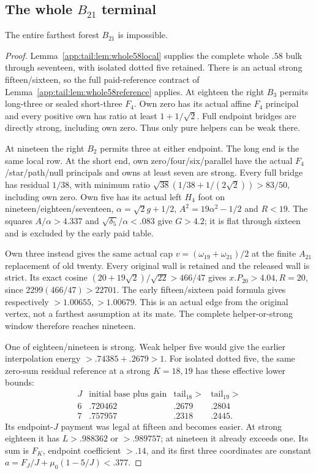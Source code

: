 \subsection{The whole $B_{21}$ terminal}
\label{app:tail:wholeB21}
\begin{proposition}
\label{app:tail:prop:wholeB21}
The entire farthest forest $B_{21}$ is impossible.
\end{proposition}
\begin{proof}
Lemma~\ref{app:tail:lem:whole58local} supplies the complete whole
$.58$ bulk through seventeen, with isolated dotted five retained.
There is an actual strong fifteen/sixteen, so the full paid-reference
contract of Lemma~\ref{app:tail:lem:whole58reference} applies.
At eighteen the right $B_3$ permits long-three or sealed short-three
$F_4$. Own zero has its actual affine $F_4$ principal and every
positive own has ratio at least $1+1/\sqrt2$. Full endpoint bridges
are directly strong, including own zero. Thus only pure helpers
can be weak there.

At nineteen the right $B_2$ permits three at either endpoint.
The long end is the same local row. At the short end, own
zero/four/six/parallel have the actual $F_4$/star/path/null
principals and owns at least seven are strong. Every full bridge
has residual $1/38$, with minimum ratio
$\sqrt{38}(1/38+1/(2\sqrt2))>83/50$, including own zero.
Own five has its actual left $H_4$ foot on nineteen/eighteen/seventeen,
$\alpha=\sqrt2g+1/2$, $A^2=19\alpha^2-1/2$ and $R<19$.
The squares $A/\alpha>4.337$ and
$\sqrt{\delta_5}/\alpha<.083$ give $G>4.2$; it is flat
through sixteen and is excluded by the early paid table.

Own three instead gives the same actual cap
$v=(\omega_{19}+\omega_{21})/2$ at the finite $A_{21}$
replacement of old twenty. Every original wall is retained and
the released wall is strict. Its exact cosine
$(20+19\sqrt2)/\sqrt{22}>466/47$ gives
$x.P_{20}>4.04,R=20$, since $2299(466/47)>22701$.
The early fifteen/sixteen paid formula gives respectively
$>1.00655,>1.00679$. This is an actual edge from the original
vertex, not a farthest assumption at its mate. The complete
helper-or-strong window therefore reaches nineteen.

One of eighteen/nineteen is strong. Weak helper five would give
the earlier interpolation energy $>.74385+.2679>1$.
For isolated dotted five, the same zero-sum residual reference at
a strong $K=18,19$ has these effective lower bounds:
\[
\begin{array}{c|c|c|c}
J&\text{initial base plus gain}&\text{tail}_{18}>&\text{tail}_{19}>\\\hline
6&.720462&.2679&.2804\\7&.757957&.2318&.2445 .
\end{array}
\]
Its endpoint-$J$ payment was legal at fifteen and becomes easier.
At strong eighteen it has $L>.988362$ or $>.989757$;
at nineteen it already exceeds one. Its sum is $F_K$, endpoint
coefficient $> .14$, and its first three coordinates are constant
$a=F_J/J+\mu_0(1-5/J)<.377$.


\end{proof}
